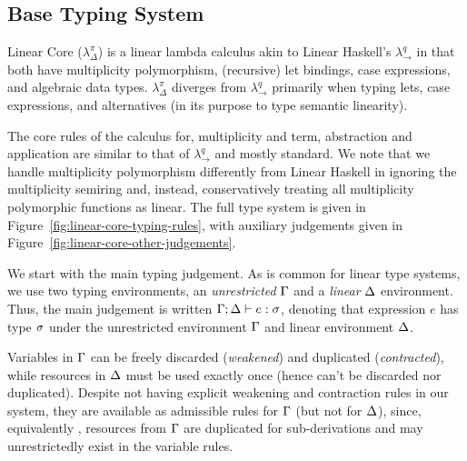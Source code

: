 \documentclass[acmsmall,review,anonymous]{acmart}
\begin{document}


\subsection{Base Typing System\label{sec:base-calculi}}

Linear Core ($\lambda^\pi_\Delta$) is a linear lambda calculus akin to Linear
Haskell's $\lambda^q_\to$ in that both have multiplicity polymorphism,
(recursive) let bindings, case expressions, and algebraic data types.
$\lambda^\pi_\Delta$ diverges from $\lambda^q_\to$ primarily when typing lets,
case expressions, and alternatives (in its purpose to type semantic linearity).
%
%

The core rules of the calculus for, multiplicity and term,
abstraction and application are similar to that of $\lambda^q_\to$ and
mostly standard. 
We note that we handle multiplicity polymorphism differently from
Linear Haskell in ignoring the multiplicity semiring and, instead,
conservatively treating all multiplicity polymorphic functions as linear.
%
The full type system is given in Figure~\ref{fig:linear-core-typing-rules},
with auxiliary judgements given in
Figure~\ref{fig:linear-core-other-judgements}.

\TypingRules
\TypingRulesOther

We start with the main typing judgement.
As is common for linear type
systems, we use two typing environments, an \emph{unrestricted} $\Gamma$ and
a \emph{linear} $\Delta$ environment.
Thus, the main judgement is written $\Gamma;\Delta \vdash e :
\sigma$,
denoting that expression $e$ has type $\sigma$ under
the unrestricted environment $\Gamma$ and linear environment $\Delta$.

%
Variables in $\Gamma$ can be freely discarded (\emph{weakened}) and
duplicated (\emph{contracted}), while resources in $\Delta$ must be used
exactly once (hence can't be discarded nor duplicated). Despite not
having explicit weakening and contraction rules in our system, they
are available as admissible rules for $\Gamma$ (but not for $\Delta$), since,
equivalently \cite{91621fae-5e53-3497-8291-32b2fab5a743}, resources
from $\Gamma$ are duplicated for sub-derivations and may unrestrictedly
exist in the variable rules.
%
\end{document}
